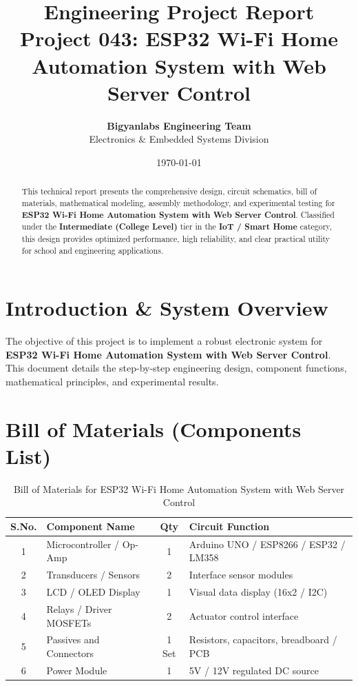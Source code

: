 \documentclass[11pt,a4paper]{article}
\title{\textbf{\Huge Engineering Project Report}\\[0.5em] \Large Project 043: ESP32 Wi-Fi Home Automation System with Web Server Control}
\author{\textbf{Bigyanlabs Engineering Team}\\ Electronics \& Embedded Systems Division}
\date{\today}
\begin{document}
\maketitle
\thispagestyle{empty}

\begin{abstract}
This technical report presents the comprehensive design, circuit schematics, bill of materials, mathematical modeling, assembly methodology, and experimental testing for \textbf{ESP32 Wi-Fi Home Automation System with Web Server Control}. Classified under the \textbf{Intermediate (College Level)} tier in the \textbf{IoT / Smart Home} category, this design provides optimized performance, high reliability, and clear practical utility for school and engineering applications.
\end{abstract}

\newpage
\tableofcontents
\newpage

\section{Introduction \& System Overview}
The objective of this project is to implement a robust electronic system for \textbf{ESP32 Wi-Fi Home Automation System with Web Server Control}. This document details the step-by-step engineering design, component functions, mathematical principles, and experimental results.

\section{Bill of Materials (Components List)}
\begin{table}[h!]
\centering
\caption{Bill of Materials for ESP32 Wi-Fi Home Automation System with Web Server Control}
\vspace{0.5em}
\begin{tabular}{clcp{7cm}}
\toprule
\textbf{S.No.} & \textbf{Component Name} & \textbf{Qty} & \textbf{Circuit Function} \\
\midrule
1 & Microcontroller / Op-Amp & 1 & Arduino UNO / ESP8266 / ESP32 / LM358 \\
2 & Transducers / Sensors & 2 & Interface sensor modules \\
3 & LCD / OLED Display & 1 & Visual data display (16x2 / I2C) \\
4 & Relays / Driver MOSFETs & 2 & Actuator control interface \\
5 & Passives and Connectors & 1 Set & Resistors, capacitors, breadboard / PCB \\
6 & Power Module & 1 & 5V / 12V regulated DC source \\
\bottomrule
\end{tabular}
\end{table}
\end{document}
